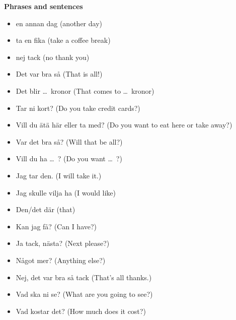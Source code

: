 
\begin{flushleft}
    \textbf{Phrases and sentences}
    \begin{itemize}
        \item en annan dag (another day)
        \item ta en fika (take a coffee break)
        \item nej tack (no thank you)
        \item Det var bra så (That is all!)
        \item Det blir \ldots\ kronor (That comes to \ldots\ kronor)
        \item Tar ni kort? (Do you take credit cards?)
        \item Vill du ätä här eller ta med? (Do you want to eat here or take away?)
        \item Var det bra så? (Will that be all?)
        \item Vill du ha \ldots\ ? (Do you want \ldots\ ?)
        \item Jag tar den. (I will take it.)
        \item Jag skulle vilja ha (I would like)
        \item Den/det där (that)
        \item Kan jag få? (Can I have?)
        \item Ja tack, nästa? (Next please?)
        \item Något mer? (Anything else?)
        \item Nej, det var bra så tack (That's all thanks.)
        \item Vad ska ni se? (What are you going to see?)
        \item Vad kostar det? (How much does it cost?)
    \end{itemize}
\end{flushleft}

